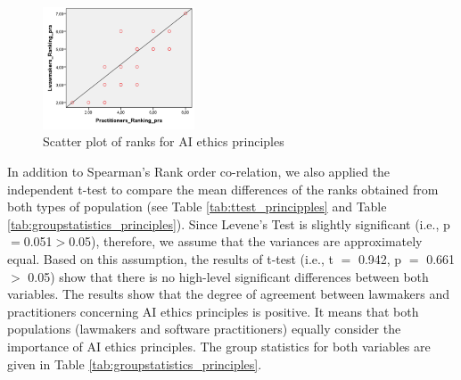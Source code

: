 \begin{figure}[]
\centering
\includegraphics[width=0.4\textwidth]{Figures/Pract-ranking.drawio.pdf} 
 	\caption{Scatter plot of ranks for AI ethics principles}
	\label{Fig:Scatter-Ranks-Principles}
\end{figure}

In addition to Spearman's Rank order co-relation, we also applied the independent t-test to compare the mean differences of the ranks obtained from both types of population (see Table \ref{tab:ttest_principples} and Table \ref{tab:groupstatistics_principles}). Since Levene's Test is slightly significant (i.e., p$=$0.051$>$0.05), therefore, we assume that the variances are approximately equal. Based on this assumption, the results of t-test (i.e., t $=$ 0.942, p $=$ 0.661 $>$ 0.05) show that there is no high-level significant differences between both variables. The results show that the degree of agreement between lawmakers and practitioners concerning AI ethics principles is positive. It means that both populations (lawmakers and software practitioners) equally consider the importance of AI ethics principles. The group statistics for both variables are given in Table \ref{tab:groupstatistics_principles}.

